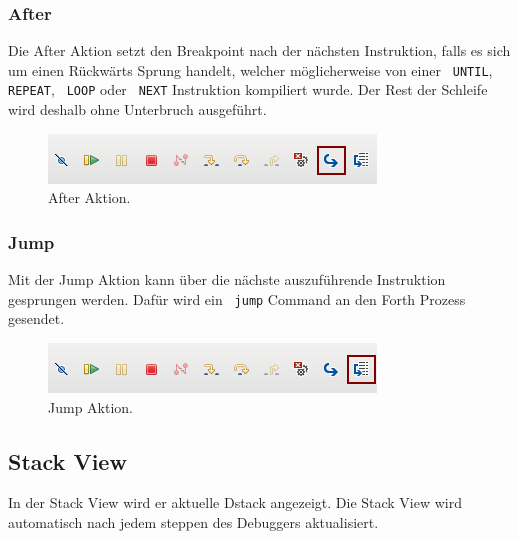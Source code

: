 \subsubsection{After}

Die After Aktion setzt den Breakpoint nach der nächsten Instruktion, falls es sich um einen Rückwärts Sprung handelt, welcher möglicherweise von einer 
\verb! UNTIL!, \verb! REPEAT!, \verb! LOOP! oder \verb! NEXT! Instruktion kompiliert wurde. Der Rest der Schleife wird deshalb ohne Unterbruch ausgeführt.

\begin{figure}[H]
	\centering
		\includegraphics[scale=1]{debugger/after.png}
		\caption{After Aktion.}
		\label{fig:extensionpoint}
\end{figure}

\subsubsection{Jump}

Mit der Jump Aktion kann über die nächste auszuführende Instruktion gesprungen werden. Dafür wird ein \verb! jump! Command an den Forth Prozess gesendet.

\begin{figure}[H]
	\centering
		\includegraphics[scale=1]{debugger/jump.png}
		\caption{Jump Aktion.}
		\label{fig:extensionpoint}
\end{figure}

\newpage

\subsection{Stack View}

In der Stack View wird er aktuelle Dstack angezeigt. Die Stack View wird automatisch nach jedem steppen des Debuggers aktualisiert.

